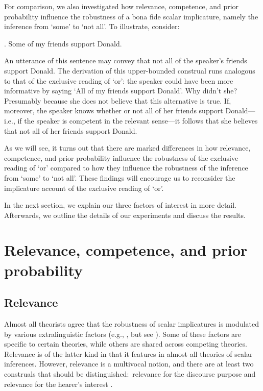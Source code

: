 \documentclass[12pt]{article}
\begin{document}
For comparison, we also investigated how relevance, competence, and prior probability influence the robustness of a bona fide scalar implicature, namely the inference from `some' to `not all'. To illustrate, consider:

\ex.	Some of my friends support Donald.

An utterance of this sentence may convey that not all of the speaker's friends support
Donald. The derivation of this upper-bounded construal runs analogous to that of the exclusive
reading of `or': the speaker could have been more informative by saying `All of my friends
support Donald'. Why didn't she? Presumably because she does not believe that this alternative
is true. If, moreover, the speaker knows whether or not all of her friends support Donald---i.e., if the speaker is competent in the relevant sense---it
follows that she believes that not all of her friends support Donald.

As we will see, it turns out that there are marked differences in how relevance, competence, and prior probability influence the robustness of the exclusive reading of `or' compared to how they influence the robustness of the inference from `some' to `not all'. These findings will encourage us to reconsider the implicature account of the exclusive reading of `or'.

In the next section, we explain our three factors of interest in more detail. Afterwards, we outline the details of our experiments and discuss the results.

\section{Relevance, competence, and prior probability}
\subsection*{Relevance}

Almost all theorists agree that the robustness of scalar implicatures is modulated by various extralinguistic factors (e.g., \citealt{chierchia2012, geurts2010, horn1972, franke2009}, but see \citealt{chierchia2004, levinson2000, storto2005}). Some of these factors are specific to certain theories, while others are shared across competing theories. Relevance is of the latter kind in that it features in almost all theories of scalar inferences. However, relevance is a multivocal notion, and there are at least two construals that should be distinguished:\ relevance for the discourse purpose and relevance for the hearer's interest \citep{geurts2010}.
\end{document}
